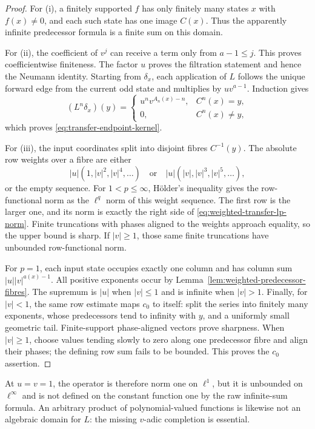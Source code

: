 \begin{proof}
For (i), a finitely supported $f$ has only finitely many states $x$ with
$f(x)\ne0$, and each such state has one image $C(x)$.  Thus the apparently
infinite predecessor formula is a finite sum on this domain.

For (ii), the coefficient of $v^j$ can receive a term only from $a-1\leq j$.
This proves coefficientwise finiteness.  The factor $u$ proves the filtration
statement and hence the Neumann identity.  Starting from $\delta_x$, each
application of $L$ follows the unique forward edge from the current odd
state and multiplies by $uv^{a-1}$.  Induction gives
\[
 (L^n\delta_x)(y)
 =\begin{cases}
 u^n v^{A_n(x)-n},&C^n(x)=y,\\
 0,&C^n(x)\ne y,
 \end{cases}
\]
which proves \eqref{eq:transfer-endpoint-kernel}.

For (iii), the input coordinates split into disjoint fibres $C^{-1}(y)$.
The absolute row weights over a fibre are either
\[
 |u|(1,|v|^2,|v|^4,\ldots)
 \quad\text{or}\quad
 |u|(|v|,|v|^3,|v|^5,\ldots),
\]
or the empty sequence.  For $1<p\leq\infty$, Hölder's inequality gives the
row-functional norm as the $\ell^q$ norm of this weight sequence.  The first
row is the larger one, and its norm is exactly the right side of
\eqref{eq:weighted-transfer-lp-norm}.  Finite truncations with phases aligned
to the weights approach equality, so the upper bound is sharp.  If
$|v|\geq1$, those same finite truncations have unbounded row-functional norm.

For $p=1$, each input state occupies exactly one column and has column sum
$|u||v|^{a(x)-1}$.  All positive exponents occur by
Lemma~\ref{lem:weighted-predecessor-fibres}.  The supremum is $|u|$ when
$|v|\leq1$ and is infinite when $|v|>1$.  Finally, for $|v|<1$, the same row
estimate maps $c_0$ to itself: split the series into finitely many exponents,
whose predecessors tend to infinity with $y$, and a uniformly small
geometric tail.  Finite-support phase-aligned vectors prove sharpness.  When
$|v|\geq1$, choose values tending slowly to zero along one predecessor fibre
and align their phases; the defining row sum fails to be bounded.  This proves
the $c_0$ assertion.
\end{proof}

At $u=v=1$, the operator is therefore norm one on $\ell^1$, but it is
unbounded on $\ell^\infty$ and is not defined on the constant function one by
the raw infinite-sum formula.  An arbitrary product of polynomial-valued
functions is likewise not an algebraic domain for $L$: the missing $v$-adic
completion is essential.

